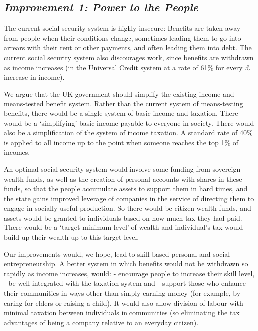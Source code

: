 \documentclass[]{tufte-handout}
\begin{document}
\hypertarget{improvement-1-power-to-the-people}{%
\subsection{\texorpdfstring{\emph{Improvement 1: Power to the
People}}{Improvement 1: Power to the People}}\label{improvement-1-power-to-the-people}}

The current social security system is highly insecure: Benefits are
taken away from people when their conditions change, sometimes leading
them to go into arrears with their rent or other payments, and often
leading them into debt. The current social security system also
discourages work, since benefits are withdrawn as income increases (in
the Universal Credit system at a rate of 61\% for every £ increase in
income).

We argue that the UK government should simplify the existing income and
means-tested benefit system. Rather than the current system of
means-testing benefits, there would be a single system of basic income
and taxation. There would be a `simplifying' basic income payable to
everyone in society. There would also be a simplification of the system
of income taxation. A standard rate of 40\% is applied to all income up
to the point when someone reaches the top 1\% of incomes.

An optimal social security system would involve some funding from
sovereign wealth funds, as well as the creation of personal accounts
with shares in these funds, so that the people accumulate assets to
support them in hard times, and the state gains improved leverage of
companies in the service of directing them to engage in socially useful
production. So there would be citizen wealth funds, and assets would be
granted to individuals based on how much tax they had paid. There would
be a `target minimum level' of wealth and individual's tax would build
up their wealth up to this target level.

Our improvements would, we hope, lead to skill-based personal and social
entrepreneurship. A better system in which benefits would not be
withdrawn so rapidly as income increases, would: - encourage people to
increase their skill level,\\
- be well integrated with the taxation system and - support those who
enhance their communities in ways other than simply earning money (for
example, by caring for elders or raising a child). It would also allow
division of labour with minimal taxation between individuals in
communities (so eliminating the tax advantages of being a company
relative to an everyday citizen).
\end{document}
